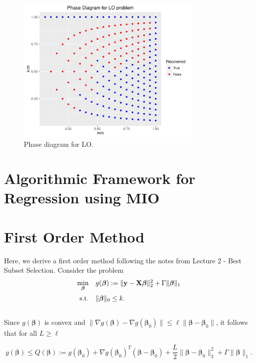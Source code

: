 \documentclass[12pt]{article}
\newcommand{\M}{\mathbf}
\newcommand{\MS}{\boldsymbol}
\newcommand{\1}{\mathds{1}}
\begin{document}
\begin{figure}[tb]
  \centering
  \includegraphics[width=0.8\textwidth]{phase_LO}
  \caption{Phase diagram for LO.}\label{fig:LO_phase}
\end{figure}

\section{Algorithmic Framework for Regression using MIO}



\section{First Order Method}

Here, we derive a first order method following the notes from Lecture 2 - Best Subset Selection.  Consider the problem
\begin{equation}
\begin{array}{rll}
  \min \limits_{\MS \beta} & g(\MS \beta) := \|\M y - \M X \MS \beta \|_2^2 + \Gamma \| \MS \beta \|_1 \vspace{5pt}\\
  \text{s.t.} & \| \MS \beta \|_0 \le k.
\end{array}
\end{equation}\\

Since $g(\MS \beta)$ is convex and $\|\nabla g(\MS \beta) - \nabla g(\MS \beta_0)\| \le \ell \| \MS \beta - \MS \beta_0\|$, it follows that for all $L \ge \ell$

\begin{equation}
g(\MS \beta) \le Q(\MS \beta) := g(\MS \beta_0) + \nabla g(\MS \beta_0)^T(\MS \beta - \MS \beta_0) + \frac{L}{2} \|\MS \beta - \MS \beta_0\|_2^2 + \Gamma \| \MS \beta \|_1.
\end{equation}\\
\end{document}
